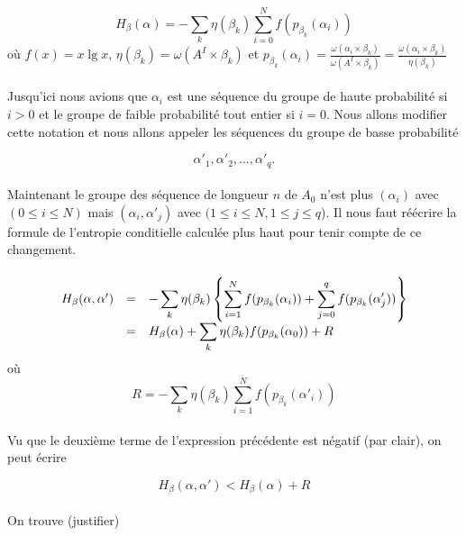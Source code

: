 	\[H_\beta(\alpha) = - \sum_k\eta(\beta_k)\sum_{i=0}^Nf(p_{\beta_k}(\alpha_i))\]
	où $f(x) = x \lg x$, $\eta(\beta_k) = \omega(A^I \times \beta_k)$ 
	et $p_{\beta_k}(\alpha_i) = \frac{\omega(\alpha_i \times \beta_k)}{\omega(A^I \times \beta_k)}=\frac{\omega(\alpha_i \times \beta_k)}{\eta(\beta_k)}$	
	
	\paragraph{}
	Jusqu'ici nous avions que $\alpha_i$ est une séquence du groupe de haute probabilité si $i>0$ et le groupe de faible probabilité tout entier si $i=0$.
	Nous allons modifier cette notation et nous allons appeler les séquences du groupe de basse probabilité 
	
	\[\alpha'_1, \alpha'_2, \dots, \alpha'_q.\]
	
	\paragraph{}
	Maintenant le groupe des séquence de longueur $n$ de $A_0$ n'est plus $(\alpha_i)$ avec $(0 \le i \le N)$ mais $(\alpha_i, \alpha'_j)$ avec $(1\le i \le N, 1 \le j \le q$).
	Il nous faut réécrire la formule de l'entropie conditielle calculée plus haut pour tenir compte de ce changement.
	
	\paragraph{}
	\[
		\begin{array}{r c >{\displaystyle}l}
			H_\beta(\alpha,\alpha') &=& - \sum_k\eta(\beta_k)\left\{\sum_{i=1}^Nf(p_{\beta_k}(\alpha_i))+\sum_{j=0}^qf(p_{\beta_k}(\alpha'_j))\right\}\\
			&=& H_\beta(\alpha) + \sum_k\eta(\beta_k)f(p_{\beta_k}(\alpha_0))+R
		\end{array}
	\]
	où
	\[R=- \sum_k\eta(\beta_k)\sum_{i=1}^Nf(p_{\beta_k}(\alpha'_i))\]
	
	\paragraph{}
	Vu que le deuxième terme de l'expression précédente est négatif (par clair), on peut écrire
	
	\[H_\beta(\alpha,\alpha') < H_\beta(\alpha) + R\]
	
	\paragraph{}
	On trouve (justifier)
	
